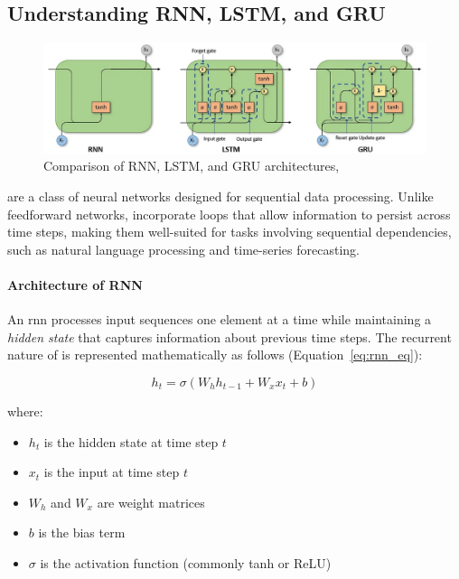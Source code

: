 \clearpage
\subsection{Understanding RNN, LSTM, and GRU}
\label{app:rnn}

\begin{figure}[H]
    \centering
    \caption{Comparison of RNN, LSTM, and GRU architectures,}
    \label{fig:rnn-lstm-gru}
    \includegraphics[width=\textwidth]{img/sections/back/rnn-lstm-gru.png}
\end{figure}

 are a class of neural networks designed for sequential data processing. Unlike feedforward 
networks,  incorporate loops that allow information to persist across time steps, making them well-suited 
for tasks involving sequential dependencies, such as natural language processing and time-series forecasting.

\paragraph{Architecture of RNN} An \acrshort{rnn} processes input sequences one element at a time while maintaining a
\emph{hidden state} that captures information about previous time steps. The recurrent nature of  is 
represented mathematically as follows (Equation~\ref{eq:rnn_eq}):

\begin{equation}
    \label{eq:rnn_eq}
    h_t = \sigma(W_h h_{t-1} + W_x x_t + b)
\end{equation}

where:
\begin{itemize}
    \item $h_t$ is the hidden state at time step $t$
    \item $x_t$ is the input at time step $t$
    \item $W_h$ and $W_x$ are weight matrices
    \item $b$ is the bias term
    \item $\sigma$ is the activation function (commonly tanh or ReLU)
\end{itemize}

